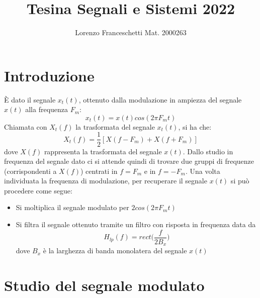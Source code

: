 \documentclass[12pt]{article}
\title{Tesina Segnali e Sistemi 2022}
\author{Lorenzo Franceschetti Mat. 2000263}
\date{}
\begin{document}
\maketitle

\section{Introduzione}
	 
È dato il segnale $x_{t}(t)$, ottenuto dalla modulazione in ampiezza del segnale $x(t)$ alla frequenza $F_{m}$: 
\begin{equation}
	x_{t}(t) = x(t) cos(2\pi F_{m}t)
\end{equation} 
Chiamata con $X_{t}(f)$ la trasformata del segnale $x_{t}(t)$, si ha che: 
\begin{equation}
	X_{t}(f) = \frac{1}{2}[X(f - F_{m}) + X(f + F_{m})]
\end{equation}
dove $X(f)$ rappresenta la trasformata del segnale $x(t)$. Dallo studio in frequenza del segnale dato ci si attende quindi di trovare due gruppi di frequenze (corrispondenti a $X(f)$) centrati in $f = F_{m}$ e in $f = -F_{m}$. Una volta individuata la frequenza di modulazione, per recuperare il segnale $x(t)$ si può procedere come segue: 
\begin{itemize}
	\item Si moltiplica il segnale modulato per $2cos(2\pi F_{m}t)$
	\item Si filtra il segnale ottenuto tramite un filtro con risposta in frequenza data da
	\begin{equation}
		H_{lp}(f) = rect \biggl(\frac{f}{2B_{x}}\biggr)
	\end{equation}
	dove $B_{x}$ è la larghezza di banda monolatera del segnale $x(t)$
\end{itemize}

\section{Studio del segnale modulato}
\end{document}
